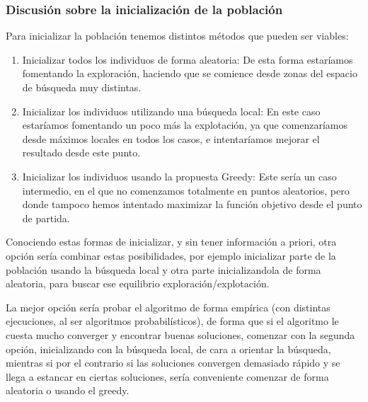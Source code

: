 \newpage

\subsubsection{Discusión sobre la inicialización de la población}

Para inicializar la población tenemos distintos métodos que pueden ser viables:

\begin{enumerate}
	\item Inicializar todos los individuos de forma aleatoria: De esta forma estaríamos fomentando la exploración, haciendo que se comience desde zonas del espacio de búsqueda muy distintas.
	\item Inicializar los individuos utilizando una búsqueda local: En este caso estaríamos fomentando un poco más la explotación, ya que comenzaríamos desde máximos locales en todos los casos, e intentaríamos mejorar el resultado desde este punto.
	\item Inicializar los individuos usando la propuesta Greedy: Este sería un caso intermedio, en el que no comenzamos totalmente en puntos aleatorios, pero donde tampoco hemos intentado maximizar la función objetivo desde el punto de partida.
\end{enumerate}

Conociendo estas formas de inicializar, y sin tener información a priori, otra opción sería combinar estas posibilidades, por ejemplo inicializar parte de la población usando la búsqueda local y otra parte inicializandola de forma aleatoria, para buscar ese equilibrio exploración/explotación.

La mejor opción sería probar el algoritmo de forma empírica (con distintas ejecuciones, al ser algoritmos probabilísticos), de forma que si el algoritmo le cuesta mucho converger y encontrar buenas soluciones, comenzar con la segunda opción, inicializando con la búsqueda local, de cara a orientar la búsqueda, mientras si por el contrario si las soluciones convergen demasiado rápido y se llega a estancar en ciertas soluciones, sería conveniente comenzar de forma aleatoria o usando el greedy.
